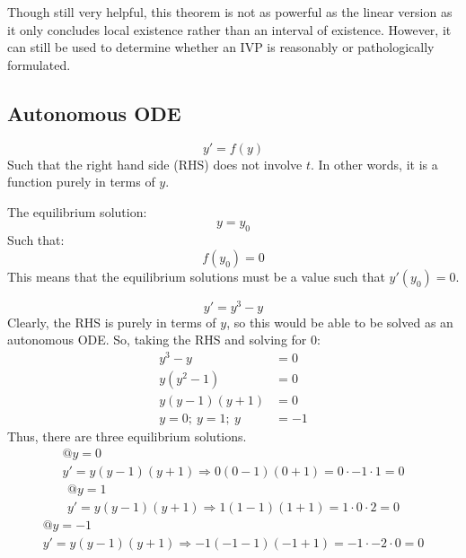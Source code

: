 \documentclass[12pt]{article}
\begin{document}
Though still very helpful, this theorem is not as powerful as the linear version as it only concludes local existence rather than an interval of existence. However, it can still be used to determine whether an IVP is reasonably or pathologically formulated.

\subsection{Autonomous ODE}
\label{ssec:autonomousODE}

\begin{equation*}
  y' = f(y)
\end{equation*}
Such that the right hand side (RHS) does not involve $t$. In other words, it is a function purely in terms of $y$.

The equilibrium solution:
\begin{equation*}
  y = y_0
\end{equation*}
Such that:
\begin{equation*}
  f(y_0) = 0
\end{equation*}
This means that the equilibrium solutions must be a value such that $y'(y_0)=0$.
\begin{example}
  \begin{equation*}
    y' = y^3 - y
  \end{equation*}
  Clearly, the RHS is purely in terms of $y$, so this would be able to be solved as an autonomous ODE. So, taking the RHS and solving for $0$:
  \begin{align*}
    y^3 - y &= 0 \\
    y\left(y^2 - 1\right) &= 0 \\
    y\left(y - 1\right)\left(y + 1\right) &= 0 \\
    y = 0;\ y = 1;\ y &= -1
  \end{align*}
  Thus, there are three equilibrium solutions.
  \begin{gather*}
    @y=0\\
    y' = y\left(y - 1\right)\left(y + 1\right) \Rightarrow 0\left(0 - 1\right)\left(0 + 1\right) = 0 \cdot -1 \cdot 1 = 0
  \end{gather*}
  \begin{gather*}
    @y=1\\
    y' = y\left(y - 1\right)\left(y + 1\right) \Rightarrow 1\left(1 - 1\right)\left(1 + 1\right) = 1 \cdot 0 \cdot 2 = 0
  \end{gather*}
  \begin{gather*}
    @y=-1\\
    y' = y\left(y - 1\right)\left(y + 1\right) \Rightarrow -1\left(-1 - 1\right)\left(-1 + 1\right) = -1 \cdot -2 \cdot 0 = 0
  \end{gather*}
\end{example}
\end{document}
